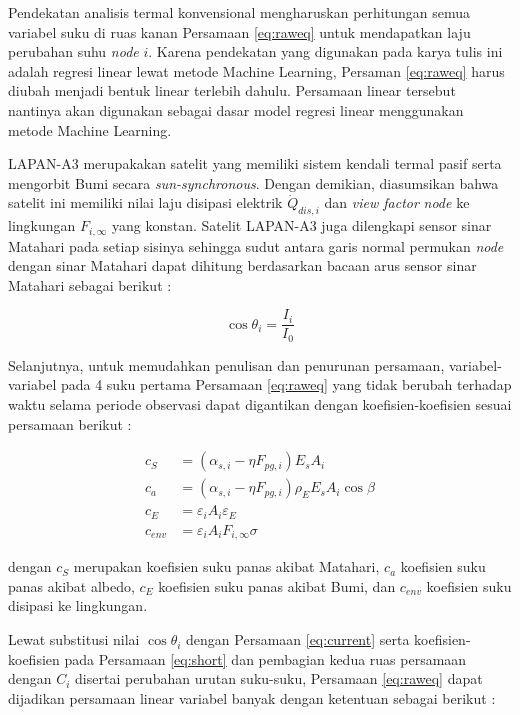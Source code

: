 Pendekatan analisis termal konvensional mengharuskan perhitungan semua variabel
suku di ruas kanan Persamaan \ref{eq:raweq} untuk mendapatkan laju perubahan
suhu \textit{node} $i$. Karena pendekatan yang digunakan pada karya tulis ini adalah
regresi linear lewat metode Machine Learning, Persaman \ref{eq:raweq} harus
diubah menjadi bentuk linear terlebih dahulu. Persamaan linear tersebut
nantinya akan digunakan sebagai dasar model regresi linear menggunakan metode
Machine Learning.

LAPAN-A3 merupakakan satelit yang memiliki sistem kendali termal pasif serta
mengorbit Bumi secara \textit{sun-synchronous}. Dengan demikian, diasumsikan
bahwa satelit ini memiliki nilai laju disipasi elektrik $\dot{Q}_{dis,i}$ dan
\textit{view factor} \textit{node} ke lingkungan $F_{i,\infty}$ yang konstan. Satelit
LAPAN-A3 juga dilengkapi sensor sinar Matahari pada setiap sisinya
\cite{hasbi2013} sehingga sudut antara garis normal permukan \textit{node} dengan sinar
Matahari dapat dihitung berdasarkan bacaan arus sensor sinar Matahari sebagai
berikut \cite{zahran2009}:

\begin{equation}
\label{eq:current}
	\cos{\theta_i} = \frac{I_i}{I_0}
\end{equation}

Selanjutnya, untuk memudahkan penulisan dan penurunan persamaan,
variabel-variabel pada 4 suku pertama Persamaan \ref{eq:raweq} yang tidak
berubah terhadap waktu selama periode observasi dapat digantikan dengan
koefisien-koefisien sesuai persamaan berikut :

\begin{equation}
\label{eq:short}
\begin{split}
	c_{S} &= \left(\alpha_{s,i} - \eta F_{pg,i}\right) E_s A_i \\
	c_{a} &= \left(\alpha_{s,i} - \eta F_{pg,i}\right)\rho_{E} E_s A_i \cos{\beta} \\
	c_{E} &= \varepsilon_i A_i \varepsilon_E \\
	c_{env} &= \varepsilon_i A_i F_{i,\infty} \sigma
\end{split}
\end{equation}

dengan $c_{S}$ merupakan koefisien suku panas akibat Matahari, $c_{a}$
koefisien suku panas akibat albedo, $c_{E}$ koefisien suku panas akibat Bumi,
dan $c_{env}$ koefisien suku disipasi ke lingkungan.

Lewat substitusi nilai $\cos{\theta_i}$ dengan Persamaan \ref{eq:current} serta
koefisien-koefisien pada Persamaan \ref{eq:short} dan pembagian kedua ruas
persamaan dengan $C_i$ disertai perubahan urutan suku-suku,
Persamaan \ref{eq:raweq} dapat dijadikan persamaan linear variabel banyak
dengan ketentuan sebagai berikut :

